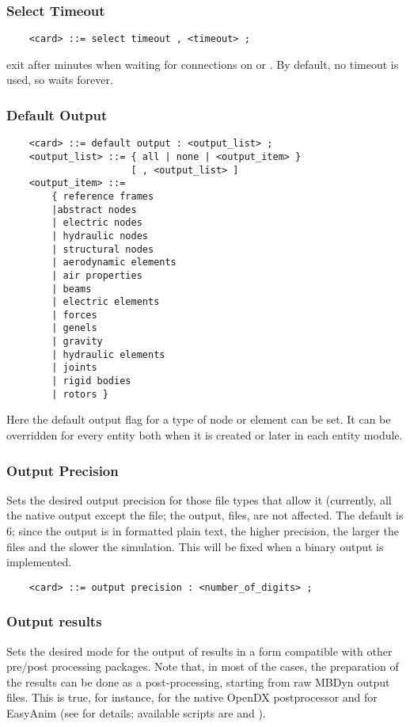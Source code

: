 \subsubsection{Select Timeout}
\begin{verbatim}
    <card> ::= select timeout , <timeout> ;
\end{verbatim}
exit after  minutes when waiting for connections 
on  or .
By default, no timeout is used, so  waits forever.

\subsubsection{Default Output}\label{sec:CONTROLDATA:DEFAULTOUTPUT}
\begin{verbatim}
    <card> ::= default output : <output_list> ;
    <output_list> ::= { all | none | <output_item> } 
                      [ , <output_list> ]
    <output_item> ::=
        { reference frames
        |abstract nodes
        | electric nodes
        | hydraulic nodes
        | structural nodes
        | aerodynamic elements
        | air properties
        | beams
        | electric elements
        | forces
        | genels
        | gravity
        | hydraulic elements
        | joints
        | rigid bodies
        | rotors }
\end{verbatim}
Here the default output flag for a type of node or element can be set. It
can be overridden for every entity both when it is created or later in
each entity module.

\subsubsection{Output Precision}
Sets the desired output precision for those file types that allow it
(currently, all the native output except the  file; the
 output,  files, are not affected.
The default is 6; since the output is in formatted plain text, the higher
precision, the larger the files and the slower the simulation.
This will be fixed when a binary output is implemented.
\begin{verbatim}
    <card> ::= output precision : <number_of_digits> ;
\end{verbatim}

\subsubsection{Output results}
Sets the desired mode for the output of results in a form
compatible with other pre/post processing packages.
Note that, in most of the cases, the preparation of the 
results can be done as a post-processing, starting from
raw MBDyn output files.
This is true, for instance, for the native OpenDX postprocessor 
and for EasyAnim (see
for details; available scripts are 
and ).


